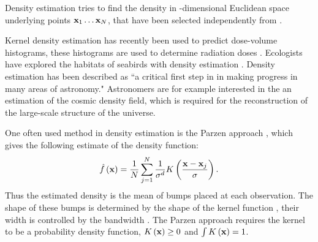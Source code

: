 Density estimation tries to find the density \varDensityFunction{\varPattern} in \varDim-dimensional Euclidean space underlying \varNumPatterns points $\varPattern[1] \dotsc \varPattern[\varNumPatterns]$, that have been selected independently from \varDensityFunction{\varPattern}. 

Kernel density estimation has recently been used to predict dose-volume histograms, these histograms are used to determine radiation doses \cite{SkarpmanDose2015}. Ecologists have explored the habitats of seabirds with density estimation \cite{lees2016using}. Density estimation has been described as ``a critical first step in in making progress in many areas of astronomy." \cite{ferdosi2011comparison} Astronomers are for example interested in the an estimation of the cosmic density field, which is required for the reconstruction of the large-scale structure of the universe.

One often used method in density estimation is the Parzen approach \cite{parzen1962estimation}, which gives the following estimate of the density function:
\begin{equation}\label{eq:1:parzen}
	\varEstimatedDensityFunction{\varPattern} = \frac{1}{\varNumPatterns}\sum_{j = 1}^{\varNumPatterns} \frac{1}{\varBandwidth^\varDim}\varKernel{\frac{\varPattern - \varPattern[j]}{\varBandwidth}}.
\end{equation}
%
Thus the estimated density is the mean of bumps placed at each observation. The shape of these bumps is determined by the shape of the kernel function \varKernel{\cdot}, their width is controlled by the bandwidth \varBandwidth \cite{silverman1986density}. The Parzen approach requires the kernel to be a probability density function, \ie $\varKernel{\varPattern} \geq 0$ and $\int \varKernel{\varPattern} = 1$.

